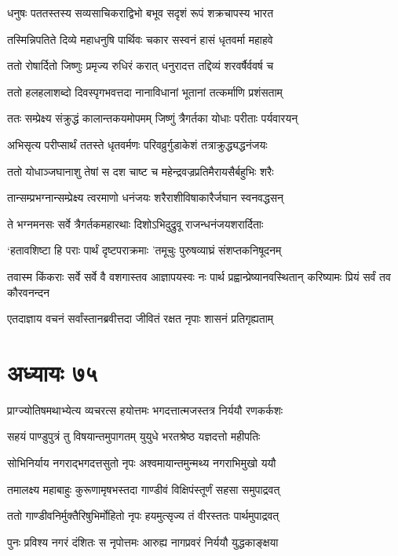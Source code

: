 \twolineshloka
{धनुषः पततस्तस्य सव्यसाचिकराद्विभो}
{बभूव सदृशं रूपं शक्रचापस्य भारत}


\twolineshloka
{तस्मिन्निपतिते दिव्ये महाधनुषि पार्थिवः}
{चकार सस्वनं हासं धृतवर्मा महाहवे}


\twolineshloka
{ततो रोषार्दितो जिष्णुः प्रमृज्य रुधिरं करात्}
{धनुरादत्त तद्दिव्यं शरवर्षैर्ववर्ष च}


\twolineshloka
{ततो हलहलाशब्दो दिवस्पृगभवत्तदा}
{नानाविधानां भूतानां तत्कर्माणि प्रशंसताम्}


\twolineshloka
{ततः सम्प्रेक्ष्य संक्रुद्धं कालान्तकयमोपमम्}
{जिष्णुं त्रैगर्तका योधाः परीताः पर्यवारयन्}


\twolineshloka
{अभिसृत्य परीप्सार्थं ततस्ते धृतवर्मणः}
{परिवव्रुर्गुडाकेशं तत्राक्रुद्ध्यद्धनंजयः}


\twolineshloka
{ततो योधाञ्जघानाशु तेषां स दश चाष्ट च}
{महेन्द्रवज्रप्रतिमैरायसैर्बहुभिः शरैः}


\twolineshloka
{तान्सम्प्रभग्नान्सम्प्रेक्ष्य त्वरमाणो धनंजयः}
{शरैराशीविषाकारैर्जघान स्वनवद्धसन्}


\twolineshloka
{ते भग्नमनसः सर्वे त्रैगर्तकमहारथाः}
{दिशोऽभिदुद्रुवू राजन्धनंजयशरार्दिताः}


\twolineshloka
{`हतावशिष्टा हि पराः पार्थं दृष्टपराक्रमाः}
{'तमूचुः पुरुषव्याघ्रं संशप्तकनिषूदनम्}


\threelineshloka
{तवास्म किंकराः सर्वे सर्वे वै वशगास्तव}
{आज्ञापयस्वः नः पार्थ प्रह्वान्प्रेष्यानवस्थितान्}
{करिष्यामः प्रियं सर्वं तव कौरवनन्दन}


\twolineshloka
{एतदाज्ञाय वचनं सर्वांस्तानब्रवीत्तदा}
{जीवितं रक्षत नृपाः शासनं प्रतिगृह्यताम्}


\chapter{अध्यायः ७५}
\twolineshloka
{प्राग्ज्योतिषमथाभ्येत्य व्यचरत्स हयोत्तमः}
{भगदत्तात्मजस्तत्र निर्ययौ रणकर्कशः}


\twolineshloka
{सहयं पाण्डुपुत्रं तु विषयान्तमुपागतम्}
{युयुधे भरतश्रेष्ठ यज्ञदत्तो महीपतिः}


\twolineshloka
{सोभिनिर्याय नगराद्भगदत्तसुतो नृपः}
{अश्वमायान्तमुन्मथ्य नगराभिमुखो ययौ}


\twolineshloka
{तमालक्ष्य महाबाहुः कुरूणामृषभस्तदा}
{गाण्डीवं विक्षिपंस्तूर्णं सहसा समुपाद्रवत्}


\twolineshloka
{ततो गाण्डीवनिर्मुक्तैरिषुभिर्मोहितो नृपः}
{हयमुत्सृज्य तं वीरस्ततः पार्थमुपाद्रवत्}


\twolineshloka
{पुनः प्रविश्य नगरं दंशितः स नृपोत्तमः}
{आरुह्य नागप्रवरं निर्ययौ युद्धकाङ्क्षया}


